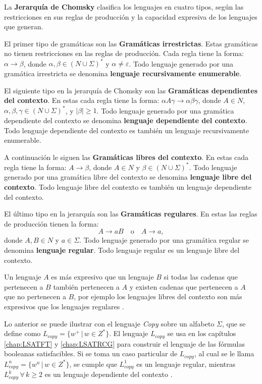 \documentclass[12pt]{article}
\begin{document}
La \textbf{Jerarquía de Chomsky} clasifica los lenguajes en cuatro tipos, según las restricciones en sus reglas de producción y la capacidad expresiva de los lenguajes que generan.

El primer tipo de gramáticas son las \textbf{Gramáticas irrestrictas}. Estas gramáticas no tienen restricciones en las reglas de producción.
Cada regla tiene la forma: \(\alpha \to \beta\), donde \(\alpha, \beta \in (N \cup \Sigma)^*\) y \(\alpha \neq \varepsilon\).
Todo lenguaje generado por una gramática irrestricta se denomina \textbf{lenguaje recursivamente enumerable}.

El siguiente tipo en la jerarquía de Chomsky son las \textbf{Gramáticas dependientes del contexto}. En estas cada regla tiene la forma: \(\alpha A \gamma \to \alpha \beta \gamma\), donde \(A \in N\), \(\alpha, \beta, \gamma \in (N \cup \Sigma)^*\), y \(|\beta| \geq 1\).
Todo lenguaje generado por una gramática dependiente del contexto se denomina \textbf{lenguaje dependiente del contexto}.
Todo lenguaje dependiente del contexto es también un lenguaje recursivamente enumerable.

A continuación le siguen las \textbf{Gramáticas libres del contexto}. En estas cada regla tiene la forma: \(A \to \beta\), donde \(A \in N\) y \(\beta \in (N \cup \Sigma)^*\).
Todo lenguaje generado por una gramática libre del contexto se denomina \textbf{lenguaje libre del contexto}.
Todo lenguaje libre del contexto es también un lenguaje dependiente del contexto.

El último tipo en la jerarquía son las \textbf{Gramáticas regulares}. En estas las reglas de producción tienen la forma:
\[
  A \to aB \quad \text{o} \quad A \to a,
\]
donde \(A, B \in N\) y \(a \in \Sigma\).
Todo lenguaje generado por una gramática regular se denomina \textbf{lenguaje regular}.
Todo lenguaje regular es un lenguaje libre del contexto.

Un lenguaje $A$ es más expresivo que un lenguaje $B$ si todas las cadenas que pertenecen a $B$ también pertenecen a $A$ y existen cadenas 
que pertenecen a $A$ que no pertenecen a $B$, por ejemplo los lenguajes libres del contexto son más expresivos que los lenguajes regulares \cite{authomataTheory}. 

Lo anterior se puede ilustrar con el lenguaje \textit{Copy} sobre un alfabeto $\Sigma$, que se define como 
$L_{copy}=\{w^+\,|\,w\in Z^*\}$. El lenguaje $L_{copy}$ se usa en los  capítulos \ref{chap:LSATFT} y 
\ref{chap:LSATRCG} para construir el lenguaje de las fórmulas booleanas satisfacibles. 
Si se toma un caso particular de $L_{copy}$, al cual se le llama $L_{copy}^n=\{w^n\,|\,w\in Z^*\}$, se cumple que 
$L_{copy}^1$ es un lenguaje regular, mientras $L_{copy}^k\,\forall\,k\geq 2$ es un lenguaje dependiente del contexto \cite{authomataTheory}.
\end{document}
